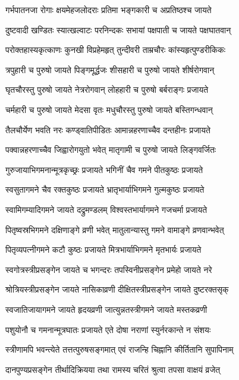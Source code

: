 \twolineshloka
{गर्भपातनजा रोगाः क्षयमेहजलोदराः}
{प्रतिमा भङ्गकारी च अप्रतिष्ठश्च जायते}%

\twolineshloka
{दुष्टवादी खण्डितः स्यात्खल्वाटः परनिन्दकः}
{सभायां पक्षपाती च जायते पक्षघातवान्}%

\twolineshloka
{परोक्तहास्यकृत्काणः कुनखी विप्रहेमहृत्}
{तुन्दीवरी ताम्रचौरः कांस्यहृत्पुण्डरीकिकः}%

\twolineshloka
{त्रपुहारी च पुरुषो जायते पिङ्गमूर्द्धजः}
{शीसहारी च पुरुषो जायते शीर्षरोगवान्}%

\twolineshloka
{घृतचौरस्तु पुरुषो जायते नेत्ररोगवान्}
{लोहहारी च पुरुषो बर्बराङ्गः प्रजायते}%

\twolineshloka
{चर्महारी च पुरुषो जायते मेदसा वृतः}
{मधुचौरस्तु पुरुषो जायते बस्तिगन्धवान्}%

\twolineshloka
{तैलचौर्येण भवति नरः कण्ड्वातिपीडितः}
{आमान्नहरणाच्चैव दन्तहीनः प्रजायते}%

\twolineshloka
{पक्वान्नहरणाच्चैव जिह्वारोगयुतो भवेत्}
{मातृगामी च पुरुषो जायते लिङ्गवर्जितः}%

\twolineshloka
{गुरुजायाभिगमनान्मूत्रकृच्छ्रः प्रजायते}
{भगिनीं चैव गमने पीतकुष्ठः प्रजायते}%

\twolineshloka
{स्वसुतागमने चैव रक्तकुष्ठः प्रजायते}
{भ्रातृभार्याभिगमने गुल्मकुष्ठः प्रजायते}%

\twolineshloka
{स्वामिगम्यादिगमने जायते दद्रुमण्डलम्}
{विश्वस्तभार्यागमने गजचर्मा प्रजायते}%

\twolineshloka
{पितृष्वस्रभिगमने दक्षिणाङ्गे व्रणी भवेत्}
{मातुलान्यास्तु गमने वामाङ्गे व्रणवान्भवेत्}%

\twolineshloka
{पितृव्यपत्नीगमने कटौ कुष्ठः प्रजायते}
{मित्रभार्याभिगमने मृतभार्यः प्रजायते}%

\twolineshloka
{स्वगोत्रस्त्रीप्रसङ्गेन जायते च भगन्दरः}
{तपस्विनीप्रसङ्गेन प्रमेहो जायते नरे}%

\twolineshloka
{श्रोत्रियस्त्रीप्रसङ्गेन जायते नासिकाव्रणी}
{दीक्षितस्त्रीप्रसङ्गेन जायते दुष्टरक्तसृक्}%

\twolineshloka
{स्वजातिजायागमने जायते हृदयव्रणी}
{जात्युन्नतस्त्रीगमने जायते मस्तकव्रणी}%

\twolineshloka
{पशुयोनौ च गमनान्मूत्रघातः प्रजायते}
{एते दोषा नराणां स्युर्नरकान्ते न संशयः}%

\twolineshloka
{स्त्रीणामपि भवन्त्येते तत्तत्पुरुषसङ्गमात्}
{एवं राजन्हि चिह्नानि कीर्तितानि सुपापिनाम्}%

\twolineshloka
{दानपुण्यप्रसङ्गेन तीर्थादिक्रियया तथा}
{रामस्य चरितं श्रुत्वा तपसा वाक्षयं व्रजेत्}%

